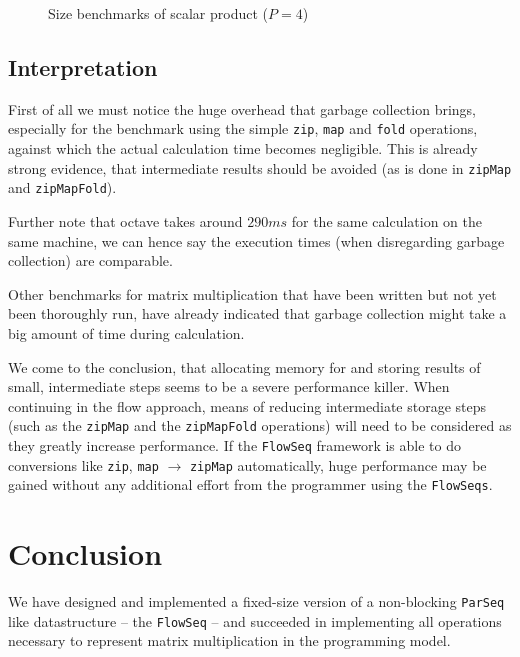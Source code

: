 \documentclass[runningheads,a4paper,fleqn]{llncs}
\begin{document}
\begin{figure}
\caption{Size benchmarks of scalar product ($P = 4$)}
\label{fig:size-bench}
\end{figure}

\subsection{Interpretation}
First of all we must notice the huge overhead that garbage collection
brings, especially for the benchmark using the simple \texttt{zip},
\texttt{map} and \texttt{fold} operations, against which the actual
calculation time becomes negligible. This 
is already strong evidence, that intermediate results should be
avoided (as is done in \texttt{zipMap} and \texttt{zipMapFold}).

Further note that octave \cite{eaton1997gnu} takes around $290 ms$ for
the same calculation on the same machine, we can hence say the
execution times (when disregarding garbage collection) are
comparable.

Other benchmarks for matrix multiplication that have been written but
not 
yet been thoroughly run, have already indicated that garbage
collection might take a big amount of time during calculation.

We come to the conclusion, that allocating memory for and
storing results of small, intermediate steps seems to be a severe
performance 
killer. When continuing in the flow approach, means of reducing
intermediate storage steps (such as the
\texttt{zipMap} and the \texttt{zipMapFold} operations) will need to
be considered as they greatly increase performance. If the \texttt{FlowSeq}
framework is able to do conversions like \texttt{zip}, \texttt{map}
$\to$ \texttt{zipMap} automatically, huge performance may be gained
without any additional effort from the programmer using the \texttt{FlowSeqs}.

\section{Conclusion}
\label{sec:conclusion}

We have designed and implemented a fixed-size version of a non-blocking
\texttt{ParSeq} like datastructure -- the \texttt{FlowSeq} -- and succeeded in
implementing all operations necessary to represent matrix
multiplication in the programming model.
\end{document}
